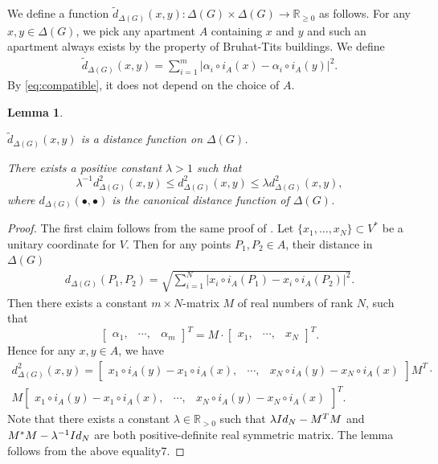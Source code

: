 \documentclass[11pt,a4paper,english]{smfart}
\theoremstyle{plain}
\newtheorem{lemma}[theorem]{Lemma}
\theoremstyle{definition}
\theoremstyle{plain}
\def\bR{\mathbb{R}}
\begin{document}
		We define a function $\tilde{d}_{\Delta(G)}(x,y):\Delta(G)\times \Delta(G)\to \bR_{\geq  0}$ as follows. For any $x,y\in \Delta(G)$, we pick any apartment $A$ containing $x$ and $y$ and such an apartment always exists by the property of  Bruhat-Tits buildings.  We define
	\begin{align}\label{eq:distancegeneral} 
\tilde{d}_{\Delta(G)}(x,y)=\sum_{i=1}^{m}|\alpha_i\circ i_A(x)-\alpha_i\circ i_A(y)|^2. 
\end{align}
By \eqref{eq:compatible}, it does not depend on the choice of $A$.
	\begin{lemma}
		\begin{thmlist}
			\item  \label{item:distance}	$\tilde{d}_{\Delta(G)}(x,y)$ is a distance function on $\Delta(G)$.  
			\item \label{item:distancediff}  There exists a positive  constant $\lambda>1$ such that $$ \lambda^{-1}d^2_{\Delta(G)}(x,y)\leq d^2_{\Delta(G)}(x,y)\leq \lambda d^2_{\Delta(G)}(x,y),$$  
			 where $d_{\Delta(G)}(\bullet,\bullet)$ is the canonical distance function of $\Delta(G)$.   
		\end{thmlist}
	\end{lemma}
	\begin{proof}
		The first claim follows from the same proof of \cite[Proposition 6.5. (a)]{Rou09}.  
Let $\{x_1,\ldots,x_N\}\subset V^*$ be a unitary coordinate for $V$.     Then for any points $P_1,P_2\in A$,  their  distance in $\Delta(G)$  %
\begin{align}\label{eq:distance}
	d_{\Delta(G)}(P_1,P_2)=\sqrt{\sum_{i=1}^{N}|x_i\circ i_A(P_1)-x_i\circ i_A(P_2)|^2}.
\end{align}
Then there exists a constant $m\times N$-matrix $M$ of real numbers of rank $N$,  such that
$$
\begin{bmatrix}
	\alpha_1, & \cdots, & \alpha_m
\end{bmatrix}^T =M\cdot  \begin{bmatrix}x_1, &\cdots, &  x_N\end{bmatrix}^T.
$$ 
Hence for any $x,y\in A$, we have
\begin{align*}
	 d^2_{\Delta(G)}(x,y)= \begin{bmatrix}x_{1}\circ i_A(y)-x_{1}\circ i_A(x), &\cdots, & x_{N}\circ i_A(y)-x_{N}\circ i_A(x)\end{bmatrix} M^T\cdot \\
	 M  \begin{bmatrix}x_{1}\circ i_A(y)-x_{1}\circ i_A(x), &\cdots, & x_{N}\circ i_A(y)-x_{N}\circ i_A(x)\end{bmatrix}^T.
\end{align*} 
Note that there exists a constant $\lambda\in \bR_{>0}$  such that 
$
\lambda {\rm Id}_{N}-M^TM
$ and 	 $
M^*M-	\lambda^{-1}  {\rm Id}_{N}
$ 
are both positive-definite real symmetric  matrix.  The lemma  follows from the above equality7. 
	\end{proof}
	 \fi
	
\end{document}
